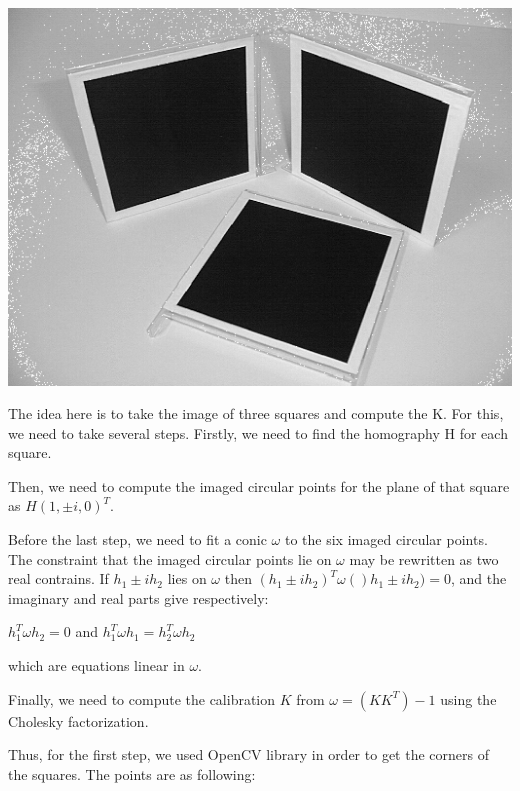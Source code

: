 \documentclass[]{article}
\begin{document}
\centerline {
	\includegraphics[scale=0.5]{squares}
}

The idea here is to take the image of three squares and compute the K. For this, we need to take several steps. Firstly, we need to find the homography H for each square. 

Then, we need to compute the imaged circular points for the plane of that square as $H(1, \pm i, 0)^T$. 


Before the last step, we need to fit a conic $\omega$ to the six imaged circular points. The constraint that the imaged circular points lie on $\omega$ may be rewritten as two real contrains. If $h_1 \pm ih_2$ lies on $\omega$ then $(h_1 \pm ih_2)^T \omega ()h_1 \pm ih_2) = 0$, and the imaginary and real parts give respectively: 

\vspace{0.5em}

\centerline {
	$h_1^T \omega h_2 = 0$ and $h_1^T \omega h_1 = h_2^T \omega h_2$
}

\vspace{0.5em}

which are equations linear in $\omega$. 

Finally, we need to compute the calibration $K$ from $\omega = (KK^T)-1$ using the Cholesky factorization. 

\vspace{0.4em}

Thus, for the first step, we used OpenCV library in order to get the corners of the squares. The points are as following:

\vspace{0.5em}
\end{document}

